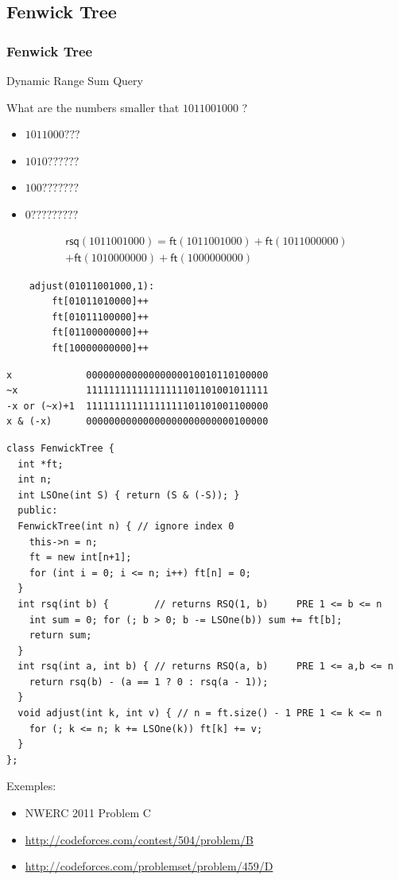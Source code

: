 \documentclass[10pt,svgnames,usenames,table]{beamer} %
\begin{document}
\subsection{Fenwick Tree}
\begin{frame}
  \frametitle{Fenwick Tree}
  Dynamic Range Sum Query

  What are the numbers smaller that $1011001000$ ?
  \begin{itemize}
    \item $1011000???$
    \item $1010??????$
    \item $100???????$
    \item $0?????????$
  \end{itemize}
  \begin{multline*}
    \mathsf{rsq}(1011001000)
    = \mathsf{ft}(1011001000)
    + \mathsf{ft}(1011000000)\\
    + \mathsf{ft}(1010000000)
    + \mathsf{ft}(1000000000)
  \end{multline*}

  \begin{lstlisting}
    adjust(01011001000,1):
        ft[01011010000]++
        ft[01011100000]++
        ft[01100000000]++
        ft[10000000000]++
  \end{lstlisting}

  \begin{lstlisting}
x             00000000000000000010010110100000
~x            11111111111111111101101001011111
-x or (~x)+1  11111111111111111101101001100000
x & (-x)      00000000000000000000000000100000
  \end{lstlisting}

  \framebreak
  \begin{lstlisting}
class FenwickTree {
  int *ft;
  int n;
  int LSOne(int S) { return (S & (-S)); }
  public:
  FenwickTree(int n) { // ignore index 0
    this->n = n;
    ft = new int[n+1];
    for (int i = 0; i <= n; i++) ft[n] = 0;
  }
  int rsq(int b) {        // returns RSQ(1, b)     PRE 1 <= b <= n
    int sum = 0; for (; b > 0; b -= LSOne(b)) sum += ft[b];
    return sum;
  }
  int rsq(int a, int b) { // returns RSQ(a, b)     PRE 1 <= a,b <= n
    return rsq(b) - (a == 1 ? 0 : rsq(a - 1));
  }
  void adjust(int k, int v) { // n = ft.size() - 1 PRE 1 <= k <= n
    for (; k <= n; k += LSOne(k)) ft[k] += v;
  }
};
  \end{lstlisting}
  \framebreak
  Exemples:
  \begin{itemize}
    \item NWERC 2011 Problem C
    \item \url{http://codeforces.com/contest/504/problem/B}
    \item \url{http://codeforces.com/problemset/problem/459/D}
  \end{itemize}
\end{frame}
\end{document}
